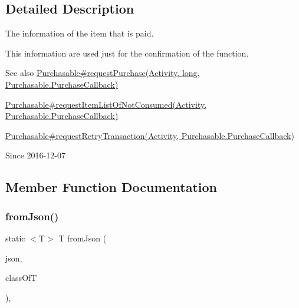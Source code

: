 \subsection{Detailed Description}
The information of the item that is paid. 

This information are used just for the confirmation of the function.

\begin{DoxySeeAlso}{See also}
\hyperlink{}{Purchasable\#request\+Purchase(\+Activity, long, Purchasable.\+Purchase\+Callback)} 

\hyperlink{}{Purchasable\#request\+Item\+List\+Of\+Not\+Consumed(\+Activity, Purchasable.\+Purchase\+Callback)} 

\hyperlink{}{Purchasable\#request\+Retry\+Transaction(\+Activity, Purchasable.\+Purchase\+Callback)} 
\end{DoxySeeAlso}
\begin{DoxySince}{Since}
2016-\/12-\/07 
\end{DoxySince}


\subsection{Member Function Documentation}
\mbox{\label{classcom_1_1toast_1_1android_1_1gamebase_1_1base_1_1_value_object_ae6655c88c20a9a8406dc11b46250ac7b}} 
\subsubsection{\texorpdfstring{from\+Json()}{fromJson()}\hspace{0.1cm}{\footnotesize\ttfamily [1/3]}}
{\footnotesize\ttfamily static $<$T$>$ T from\+Json (\begin{DoxyParamCaption}\item[{@Non\+Null String}]{json,  }\item[{Class$<$ T $>$}]{class\+OfT }\end{DoxyParamCaption})\hspace{0.3cm}{\ttfamily [static]}, {\ttfamily [inherited]}}

